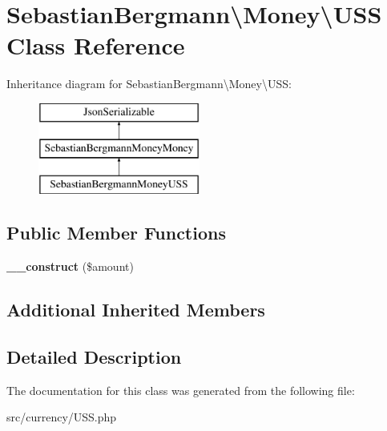 \hypertarget{classSebastianBergmann_1_1Money_1_1USS}{}\section{Sebastian\+Bergmann\textbackslash{}Money\textbackslash{}U\+S\+S Class Reference}
\label{classSebastianBergmann_1_1Money_1_1USS}
Inheritance diagram for Sebastian\+Bergmann\textbackslash{}Money\textbackslash{}U\+S\+S\+:\begin{figure}[H]
\begin{center}
\leavevmode
\includegraphics[height=3.000000cm]{classSebastianBergmann_1_1Money_1_1USS}
\end{center}
\end{figure}
\subsection*{Public Member Functions}
\begin{DoxyCompactItemize}
\item 
\hypertarget{classSebastianBergmann_1_1Money_1_1USS_a1f6c13e000eefeb3fccff88e6f88fc05}{}{\bfseries \+\_\+\+\_\+construct} (\$amount)\label{classSebastianBergmann_1_1Money_1_1USS_a1f6c13e000eefeb3fccff88e6f88fc05}

\end{DoxyCompactItemize}
\subsection*{Additional Inherited Members}


\subsection{Detailed Description}


The documentation for this class was generated from the following file\+:\begin{DoxyCompactItemize}
\item 
src/currency/U\+S\+S.\+php\end{DoxyCompactItemize}
